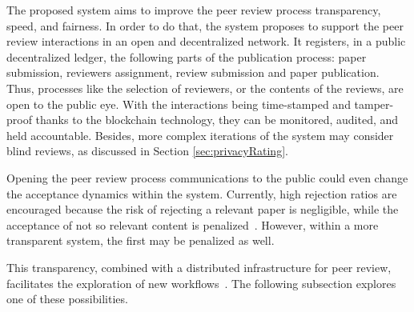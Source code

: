 The proposed system aims to improve the peer review process transparency, speed,
and fairness. In order to do that, the system proposes to support the peer
review interactions in an open and decentralized network. It registers, in a
public decentralized ledger, the following parts of the publication process:
paper submission, reviewers assignment, review submission and paper publication.
Thus, processes like the selection of reviewers, or the contents of the reviews,
are open to the public eye. With the interactions being time-stamped and
tamper-proof thanks to the blockchain technology, they can be monitored,
audited, and held accountable. Besides, more complex iterations of the system
may consider blind reviews, as discussed in Section \ref{sec:privacyRating}.

Opening the peer review process communications to the public could even change
the acceptance dynamics within the system. Currently, high rejection ratios are
encouraged because the risk of rejecting a relevant paper is negligible, while
the acceptance of not so relevant content is
penalized~\cite{ReinventingRigor,garfield2007evolution}. However, within a more
transparent system, the first may be penalized as well.

This transparency, combined with a distributed infrastructure for peer review,
facilitates the exploration of new workflows~\cite{ReinventingSocioTech}. The
following subsection explores one of these possibilities.





